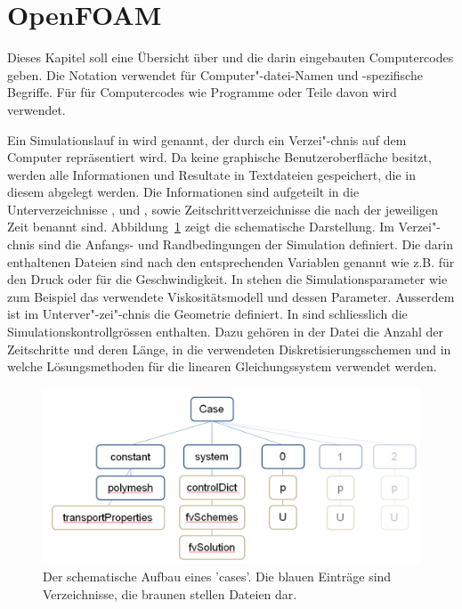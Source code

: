 \section{OpenFOAM}
\label{Kapitel:AnhangOpenFOAM}
Dieses Kapitel soll eine Übersicht über \openfoam{} und die darin eingebauten Computercodes geben.
Die Notation verwendet  für Computer"-datei-Namen und \openfoam{}-spezifische Begriffe. Für für Computercodes wie Programme oder Teile davon wird  verwendet.

Ein Simulationslauf in \openfoam{} wird  genannt, der durch ein Verzei"-chnis auf dem Computer repräsentiert wird. Da \openfoam{} keine gra\-phi\-sche Benutzeroberfläche besitzt, werden alle Informationen und Resultate in Textdateien gespeichert, die in diesem  abgelegt werden.
Die Informationen sind aufgeteilt in die Unterverzeichnisse ,  und , sowie Zeitschrittverzeichnisse die nach der jeweiligen Zeit benannt sind. Abbildung~\ref{fig:ofCaseSchema} zeigt die schematische Darstellung.
Im Verzei"-chnis  sind die Anfangs- und Randbedingungen der Simulation definiert. Die darin enthaltenen Dateien sind nach den entsprechenden Variablen genannt wie z.B.  für den Druck oder  für die Geschwindigkeit.
In  stehen die Simulationsparameter wie zum Beispiel das verwendete Viskositätsmodell und dessen Parameter. Ausserdem ist im Unterver"-zei"-chnis  die Geometrie definiert.
In  sind schliesslich die Simulationskontrollgrössen enthalten. Dazu gehören in der Datei  die Anzahl der Zeitschritte und deren Länge, in  die verwendeten Diskretisierungsschemen und in  welche Lösungsmethoden für die linearen Gleichungssystem verwendet werden.

\begin{figure}
    \centering
    \includegraphics[width=\textwidth]{figures/OfCaseSchema.png}
    \caption{Der schematische Aufbau eines \openfoam{} 'cases'. Die blauen Einträge sind Verzeichnisse, die braunen stellen Dateien dar.}
    \label{fig:ofCaseSchema}
\end{figure}
%
